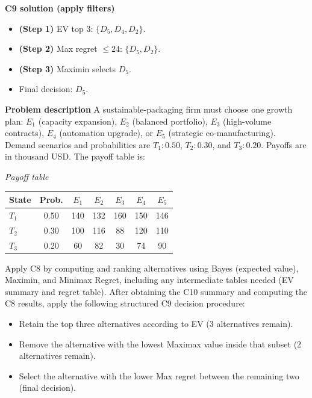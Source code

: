 \begin{ExamProblems}
		\textbf{C9 solution (apply filters)}\par
		\begin{itemize}
			\item \textbf{(Step 1)} EV top 3: $\{D_5,D_4,D_2\}$.
			\item \textbf{(Step 2)} Max regret $\leq 24$: $\{D_5,D_2\}$.
			\item \textbf{(Step 3)} Maximin selects $D_5$.
			\item Final decision: $D_5$.
		\end{itemize}
		
		\newpage
		\item
		\textbf{Problem description}
		A sustainable-packaging firm must choose one growth plan: $E_1$ (capacity expansion), $E_2$ (balanced portfolio), $E_3$ (high-volume contracts), $E_4$ (automation upgrade), or $E_5$ (strategic co-manufacturing).
		Demand scenarios and probabilities are $T_1:0.50$, $T_2:0.30$, and $T_3:0.20$. Payoffs are in thousand USD. The payoff table is:
		
		\begin{center}
			\textit{Payoff table} \\
			\begin{tabular}{l c c c c c c}
				\hline
				State& Prob. & $E_1$ & $E_2$ & $E_3$ & $E_4$ & $E_5$ \\
				\hline
				$T_1$ & 0.50 & 140 & 132 & 160 & 150 & 146 \\
				$T_2$ & 0.30 & 100 & 116 & 88 & 120 & 110 \\
				$T_3$ & 0.20 & 60 & 82 & 30 & 74 & 90 \\
				\hline
			\end{tabular}
		\end{center}
		
		Apply C8 by computing and ranking alternatives using Bayes (expected value), Maximin, and Minimax Regret, including any intermediate tables needed (EV summary and regret table).
		After obtaining the C10 summary and computing the C8 results, apply the following structured C9 decision procedure:
		\begin{itemize}
			\item Retain the top three alternatives according to EV (3 alternatives remain).
			\item Remove the alternative with the lowest Maximax value inside that subset (2 alternatives remain).
			\item Select the alternative with the lower Max regret between the remaining two (final decision).
		\end{itemize}
		

\end{ExamProblems}
